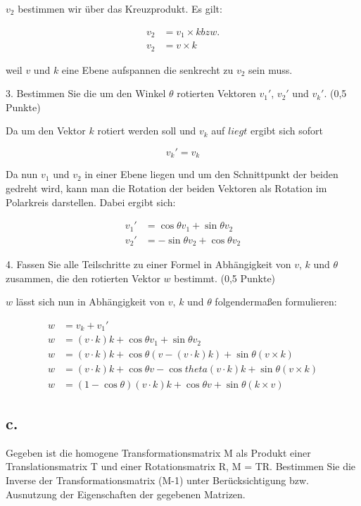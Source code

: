 \documentclass[12pt]{scrreprt}
\begin{document}
$v_2$ bestimmen wir über das Kreuzprodukt. Es gilt:

\begin{align*}
	v_2 &= v_1 \times k bzw.\\
	v_2 &= v \times k
\end{align*}

weil $v$ und $k$ eine Ebene aufspannen die senkrecht zu $v_2$ sein muss.

3. Bestimmen Sie die um den Winkel $\theta$ rotierten Vektoren $v_1'$, $v_2'$ und $v_k'$. (0,5 Punkte)

Da um den Vektor $k$ rotiert werden soll und $v_k$ auf $liegt$ ergibt sich sofort

\[
	v_k' = v_k
\]

Da nun $v_1$ und $v_2$ in einer Ebene liegen und um den Schnittpunkt der beiden gedreht wird, kann man die Rotation der beiden Vektoren als Rotation im Polarkreis darstellen. Dabei ergibt sich:

\begin{align*}
	v_1' &= \cos{\theta} v_1 + \sin{\theta} v_2\\
	v_2' &= -\sin{\theta} v_2 + \cos{\theta} v_2
\end{align*}

4. Fassen Sie alle Teilschritte zu einer Formel in Abhängigkeit von $v$, $k$ und $\theta$ zusammen, die den
rotierten Vektor $w$ bestimmt. (0,5 Punkte)

$w$ lässt sich nun in Abhängigkeit von $v$, $k$ und $\theta$ folgendermaßen formulieren:

\begin{align*}
	w &= v_k + v_1'\\
	w &= (v \cdot k)k + \cos{\theta} v_1 + \sin{\theta} v_2\\
	w &= (v \cdot k)k + \cos{\theta} (v - (v \cdot k)k) + \sin{\theta} (v \times k)\\
	w &= (v \cdot k)k + \cos{\theta}v - \cos{theta}(v \cdot k)k + \sin{\theta}(v \times k)\\
	w &= (1 - \cos{\theta})(v \cdot k)k + \cos{\theta}v + \sin{\theta}(k \times v)
\end{align*}

\subsection*{c.}

Gegeben ist die homogene Transformationsmatrix M als Produkt einer Translationsmatrix T und einer
Rotationsmatrix R, M = TR. Bestimmen Sie die Inverse der Transformationsmatrix (M-1) unter
Berücksichtigung bzw. Ausnutzung der Eigenschaften der gegebenen Matrizen.
\end{document}
